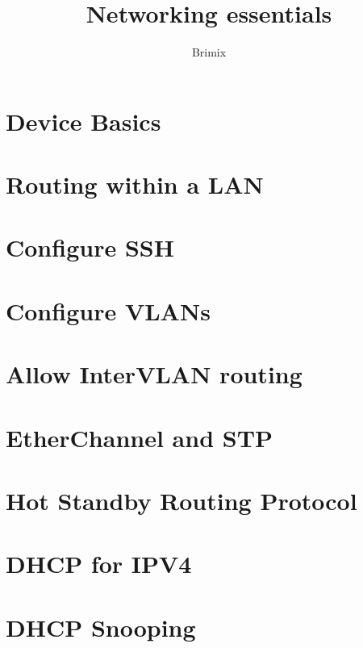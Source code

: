 \documentclass{article}
\begin{document}
\begin{landscape}

\title{Networking essentials}
\author{Brimix}


\section{Device Basics}

\clearpage

\section{Routing within a LAN}


\section{Configure SSH}

\clearpage

\section{Configure VLANs}

\clearpage

\section{Allow InterVLAN routing}

\clearpage

\section{EtherChannel and STP}


\section{Hot Standby Routing Protocol}

\clearpage

\section{DHCP for IPV4}

\clearpage

\section{DHCP Snooping}

\clearpage


\end{landscape}
\end{document}
